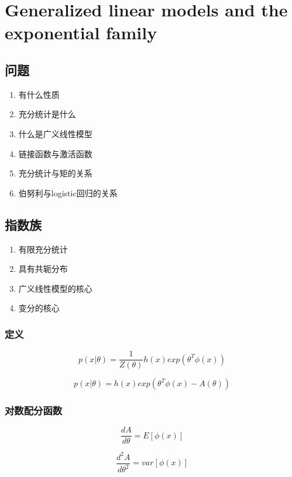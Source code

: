 \chapter{Generalized linear models and the exponential family}
\section{问题}
\begin{enumerate}
\item 有什么性质
\item 充分统计是什么
\item 什么是广义线性模型
\item 链接函数与激活函数
\item 充分统计与矩的关系
\item 伯努利与logistic回归的关系
\end{enumerate}
\section{指数族}
\begin{enumerate}
\item 有限充分统计
\item 具有共轭分布
\item 广义线性模型的核心
\item 变分的核心
\end{enumerate}
\subsection{定义}
\begin{equation}
p(x|\theta) = \frac{1}{Z(\theta)}
h(x)exp(\theta^T\phi(x))
\end{equation}

\begin{equation}
p(x|\theta) =
h(x)exp(\theta^T\phi(x)-A(\theta))
\end{equation}

\subsection{对数配分函数}

\begin{equation}
\frac{dA}{d\theta} = E[\phi(x)]
\end{equation}

\begin{equation}
\frac{d^2A}{d\theta^2} = var[\phi(x)]
\end{equation}

